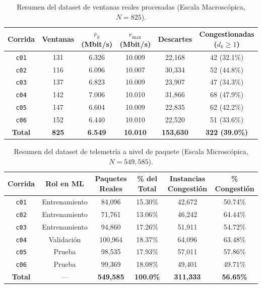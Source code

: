 \documentclass[11pt,a4paper]{article}
\begin{document}
\begin{table}[H]
\centering
\small
\caption{Resumen del dataset de ventanas reales procesadas (Escala Macroscópica, $N = 825$).}
\label{tab:resumen_dataset}
\begin{tabular}{cccccc}
\toprule
\textbf{Corrida} & \textbf{Ventanas} & \textbf{$\bar{r}_k$ (Mbit/s)} & \textbf{$r_{\max}$ (Mbit/s)} & \textbf{Descartes} & \textbf{Congestionadas ($d_k \ge 1$)} \\
\midrule
\texttt{c01} & 131 & 6.326 & 10.009 & 22,168 & 42 (32.1\%) \\
\texttt{c02} & 116 & 6.096 & 10.007 & 30,334 & 52 (44.8\%) \\
\texttt{c03} & 137 & 6.823 & 10.009 & 23,907 & 47 (34.3\%) \\
\texttt{c04} & 142 & 7.006 & 10.010 & 31,866 & 68 (47.9\%) \\
\texttt{c05} & 147 & 6.604 & 10.009 & 22,835 & 62 (42.2\%) \\
\texttt{c06} & 152 & 6.440 & 10.010 & 22,520 & 51 (33.6\%) \\
\midrule
\textbf{Total} & \textbf{825} & \textbf{6.549} & \textbf{10.010} & \textbf{153,630} & \textbf{322 (39.0\%)} \\
\bottomrule
\end{tabular}
\end{table}

\begin{table}[H]
\centering
\small
\caption{Resumen del dataset de telemetría a nivel de paquete (Escala Microscópica, $N = 549,585$).}
\label{tab:resumen_paquetes}
\begin{tabular}{cccccc}
\toprule
\textbf{Corrida} & \textbf{Rol en ML} & \textbf{Paquetes Reales} & \textbf{\% del Total} & \textbf{Instancias Congestión} & \textbf{\% Congestión} \\
\midrule
\texttt{c01} & Entrenamiento & 84,096  & 15.30\% & 42,672 & 50.74\% \\
\texttt{c02} & Entrenamiento & 71,761  & 13.06\% & 46,242 & 64.44\% \\
\texttt{c03} & Entrenamiento & 94,860  & 17.26\% & 51,911 & 54.72\% \\
\texttt{c04} & Validación    & 100,964 & 18.37\% & 64,096 & 63.48\% \\
\texttt{c05} & Prueba        & 98,535  & 17.93\% & 57,011 & 57.86\% \\
\texttt{c06} & Prueba        & 99,369  & 18.08\% & 49,401 & 49.71\% \\
\midrule
\textbf{Total} & — & \textbf{549,585} & \textbf{100.0\%} & \textbf{311,333} & \textbf{56.65\%} \\
\bottomrule
\end{tabular}
\end{table}
\end{document}
